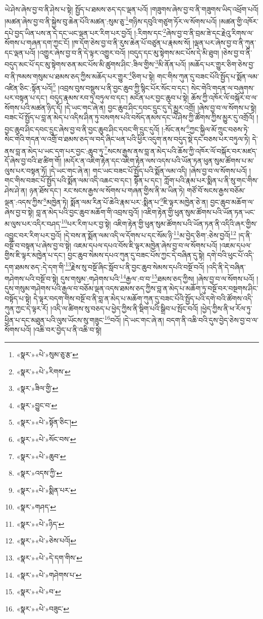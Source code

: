 ཡེ་ཤེས་ཞེས་བྱ་བ་ནི་ཤེས་པ་སྟེ། སྤྱོད་པ་ཐམས་ཅད་དང་ལྡན་པའོ། །གཟུགས་ཞེས་བྱ་བ་ནི་གཟུགས་ཡིད་འཕྲོག་པའོ། །མཚན་ཞེས་བྱ་བ་ནི་སྐྱེས་བུ་ཆེན་པོའི་མཚན་:སུམ་ཅུ་\footnote{«སྣར་»«པེ་»སུམ་ཅུ་རྩ་}གཉིས་དབུའི་གཙུག་ཏོར་ལ་སོགས་པའོ། །མཚན་གྱི་འཁོར་དཔེ་བྱད་ཡིན་པས་ན་དེ་དང་ཡང་ལྡན་པར་རིག་པར་བྱའོ། །:རིགས་དང་\footnote{«སྣར་»«པེ་»རིགས་}ཞེས་བྱ་བ་ནི་བྲམ་ཟེ་དང་རྗེའུ་རིགས་ལ་སོགས་པ་གཞན་དག་ཀྱང་ངོ། །ཁ་དོག་ཅེས་བྱ་བ་ནི་རུས་ཆེན་པོ་བཙུན་པ་རྣམས་སོ། །ལྡན་པར་ཞེས་བྱ་བ་ནི་ཀུན་དང་ལྡན་པའོ། །འགྱུར་ཞེས་བྱ་བ་ནི་དེ་ལྟར་འགྱུར་བའོ། །བདུད་དང་མུ་སྟེགས་མང་པོས་དེ་མི་ཐུབ། །ཅེས་བྱ་བ་ནི་བདུད་མང་པོ་དང་མུ་སྟེགས་ཅན་མང་པོས་མི་ཚུགས་ཤིང་:ཟིལ་གྱིས་\footnote{«སྣར་»ཟིལ་གྱི་}མི་ནོན་པའོ། །མཆོད་པར་གྱུར་ཅིག་ཅེས་བྱ་བ་ནི་ཁམས་གསུམ་པ་ཐམས་ཅད་ཀྱིས་མཆོད་པར་གྱུར་\footnote{«སྣར་»བྱུང་བ་}ཅིག་པ་སྟེ། གང་གིས་ཀུན་དུ་བཟང་པོའི་སྤྱོད་པ་སྨོན་ལམ་འཛིན་ཅིང་:སྟོན་པའོ།\footnote{«སྣར་»«པེ་»སྟོན་ཅིང་།} །འབྲས་བུས་བསྡུས་པ་ནི་བྱང་ཆུབ་ཀྱི་སྙིང་པོར་སོང་བ་དང་། སེང་གེའི་གདན་ལ་བཞུགས་པར་བསྟན་པ་དང་། བདུད་རྣམས་རབ་ཏུ་བཏུལ་བ་དང་། མངོན་པར་བྱང་ཆུབ་པ་སྟེ། ཆོས་ཀྱི་འཁོར་ལོ་བསྐོར་བ་ལ་སོགས་པའི་མཚན་ཉིད་དོ། །དེ་ཡང་གང་ཞེ་ན། བྱང་ཆུབ་ཤིང་དབང་དྲུང་དུ་དེ་མྱུར་འགྲོ། །ཞེས་བྱ་བ་ལ་སོགས་པ་སྟེ། བཟང་པོ་སྤྱོད་པ་བླ་ན་མེད་པ་འདིས་ཤིན་ཏུ་བསགས་པའི་བསོད་ནམས་དང་ཡེ་ཤེས་ཀྱི་ཚོགས་ཀྱིས་མྱུར་དུ་འགྲོའོ། །བྱང་ཆུབ་ཤིང་དབང་དྲུང་ཞེས་བྱ་བ་ནི་བྱང་ཆུབ་ཤིང་དབང་གི་དྲུང་དུའོ། །:སོང་ནས་\footnote{«སྣར་»«པེ་»སོང་བས་}ཀྱང་སྐྱིལ་མོ་ཀྲུང་བཅས་ཏེ་སེང་གེའི་གདན་ལ་འགྲོ་བ་ཐམས་ཅད་ལ་བདེ་ཞིང་ཕན་པའི་ཕྱིར་འདུག་ནས་བདུད་སྡེ་དང་བཅས་པར་བཏུལ་ཏེ། དེ་ནས་བླ་ན་མེད་པ་ཡང་དག་པར་བྱང་:ཆུབ་ཏུ་\footnote{«སྣར་»«པེ་»ཆུབ་}སངས་རྒྱས་ནས་བླ་ན་མེད་པའི་ཆོས་ཀྱི་འཁོར་ལོ་བསྐོར་བར་མཛད་དོ་ཞེས་བྱ་བའི་ཐ་ཚིག་གོ། །མདོར་ན་འཇིག་རྟེན་དང་འཇིག་རྟེན་ལས་འདས་པའི་ཡོན་ཏན་ཕུན་སུམ་ཚོགས་པ་མ་ལུས་པར་བསྟན་ཏོ། །དེ་ཡང་གང་ཞེ་ན། གང་ཡང་བཟང་པོ་སྤྱོད་པའི་སྨོན་ལམ་འདི། །ཞེས་བྱ་བ་ལ་སོགས་པའོ། །གང་གིས་བཟང་པོ་སྤྱོད་པའི་སྨོན་ལམ་འདི་འཆང་བ་དང་། སྟོན་པ་དང་། ཀློག་པའི་རྣམ་པར་སྨིན་པ་ནི་སུ་གང་གིས་ཤེས་ཤེ་ན། ཉན་ཐོས་དང་། རང་སངས་རྒྱས་ལ་སོགས་པ་གཞན་གྱིས་ནི་མ་ཡིན་ཏེ། གཙོ་བོ་སངས་རྒྱས་བཅོམ་ལྡན་:འདས་ཀྱིས་\footnote{«སྣར་»འདས་ཀྱི་}མཁྱེན་ཏེ། སྨོན་ལམ་རིན་པོ་ཆེའི་རྣམ་པར་:སྨིན་པ་\footnote{«སྣར་»«པེ་»སྨིན་པར་}ཇི་ལྟར་མཁྱེན་ཅེ་ན། བྱང་ཆུབ་མཆོག་ལ་ཞེས་བྱ་བ་སྟེ། བླ་ན་མེད་པའི་བྱང་ཆུབ་མཆོག་གི་འབྲས་བུའོ། །འཇིག་རྟེན་གྱི་ཕུན་སུམ་ཚོགས་པའི་ཡོན་ཏན་ཡང་མ་ལུས་པར་འདིར་བཤད་\footnote{«སྣར་»གཤད་}པར་རིག་པར་བྱ་སྟེ། འཇིག་རྟེན་གྱི་ཕུན་སུམ་ཚོགས་པའི་ཡོན་ཏན་ནི་འདིའི་ཞར་གྱིས་འབྱུང་བར་རིག་པར་བྱའོ། །དེ་བས་ན་སྨོན་ལམ་འདི་ལ་དོགས་པ་དང་སོམ་ཉི་\footnote{«སྣར་»«པེ་»ཉིད་}མ་བྱེད་ཅིག་:ཅེས་བྱའོ།\footnote{«སྣར་»«པེ་»ཅེས་པའོ།} །ད་ནི་བསྔོ་བ་བསྟན་པ་ཞེས་བྱ་བ་སྟེ། འཇམ་དཔལ་དཔའ་བོས་ཇི་ལྟར་མཁྱེན་ཞེས་བྱ་བ་ལ་སོགས་པའོ། །འཇམ་དཔལ་གྱིས་ཇི་ལྟར་མཁྱེན་པ་དང་། བྱང་ཆུབ་སེམས་དཔའ་ཀུན་དུ་བཟང་པོས་ཀྱང་དེ་བཞིན་དུ་སྟེ། དགེ་བའི་ཕུང་པོ་འདི་དག་ཐམས་ཅད་:དེ་དག་གི་\footnote{«སྣར་»«པེ་»དེ་དག་གིས་}རྗེས་སུ་བསྔོ་ཞིང་སློབ་པ་ནི་བྱང་ཆུབ་སེམས་དཔའི་བསྔོ་བའོ། །འདི་ནི་དེ་བཞིན་གཤེགས་པའི་བསྔོ་བ་སྟེ། དུས་གསུམ་:གཤེགས་པའི་\footnote{«སྣར་»«པེ་»གཤེགས་པ་}རྒྱལ་:བ་བ་\footnote{«སྣར་»«པེ་»བ་}ཐམས་ཅད་ཀྱིས། །ཞེས་བྱ་བ་ལ་སོགས་པའོ། །དུས་གསུམ་གཤེགས་པའི་རྒྱལ་བ་བཅོམ་ལྡན་འདས་ཐམས་ཅད་ཀྱིས་བླ་ན་མེད་པ་མཆོག་ཏུ་བསྔོ་བར་བསྔགས་ཤིང་བསྟོད་པ་སྟེ། དེ་ལྟར་བདག་གིས་བསྔོ་བ་ནི་བླ་ན་མེད་པ་མཆོག་ཀུན་དུ་བཟང་པོའི་སྤྱོད་པའི་དགེ་བའི་ཚོགས་འདི་ཀུན་ཀྱང་དེ་ལྟར་རོ། །འདི་ལ་ཚིགས་སུ་བཅད་པ་ཕྱེད་ཀྱིས་ནི་སྡིག་པའི་སྒྲིབ་པ་སྤོང་བའོ། །ཕྱེད་ཀྱིས་ནི་ཕ་རོལ་ཏུ་ཕྱིན་པ་དང་མཐུན་པའི་ལུས་ཡོངས་སུ་གཟུང་\footnote{«སྣར་»«པེ་»བཟུང་}བའོ། །དེ་ཡང་གང་ཞེ་ན། བདག་ནི་འཆི་བའི་དུས་བྱེད་ཅེས་བྱ་བ་ལ་སོགས་པའོ། །འཆི་བར་བྱེད་པ་ནི་འཆི་བ་སྟེ། 
